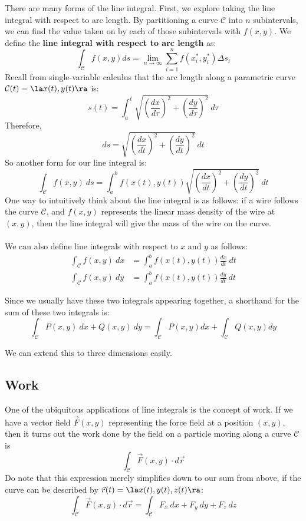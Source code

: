 \documentclass[12pt]{article}
\begin{document}
There are many forms of the line integral. First, we explore taking the line integral with respect to arc length. By partitioning a curve $\mathcal{C}$ into $n$ subintervals, we can find the value taken on by each of those subintervals with $f(x,y)$. We define the \textbf{line integral with respect to arc length} as: \[ \int_{\mathcal{C}}f(x,y) ds = \lim_{n \to \infty}\sum_{i=1}^nf(x_i^*,y_i^*)\Delta s_i \]
Recall from single-variable calculus that the arc length along a parametric curve $\mathcal{C}(t) = \la x(t), y(t) \ra$ is: \[ s(t) = \int_a^t\sqrt{\left(\frac{dx}{d\tau}\right)^2 + \left(\frac{dy}{d\tau}\right)^2} \ d\tau \]
Therefore, \[ ds = \sqrt{\left(\frac{dx}{dt}\right)^2 + \left(\frac{dy}{dt}\right)^2} \ dt \]
So another form for our line integral is:
\[ \boxed{\int_{\mathcal{C}}f(x,y) \ ds = \int_a^b f(x(t),y(t)) \sqrt{\left(\frac{dx}{dt}\right)^2 + \left(\frac{dy}{dt}\right)^2} \ dt} \]
One way to intuitively think about the line integral is as follows: if a wire follows the curve $\mathcal{C}$, and $f(x,y)$ represents the linear mass density of the wire at $(x,y)$, then the line integral will give the mass of the wire on the curve. \\ \\
We can also define line integrals with respect to $x$ and $y$ as follows:
\[
\begin{aligned}
\int_{\mathcal{C}}f(x,y) \ dx &= \int_a^b f(x(t),y(t))\frac{dx}{dt} \ dt \\
\int_{\mathcal{C}}f(x,y) \ dy &= \int_a^b f(x(t),y(t))\frac{dy}{dt} \ dt
\end{aligned}
\]

Since we usually have these two integrals appearing together, a shorthand for the sum of these two integrals is:
\[ \int_{\mathcal{C}}P(x,y) \ dx + Q(x,y) \ dy = \int_{\mathcal{C}}P(x,y) dx + \int_{\mathcal{C}} Q(x,y) dy \]

We can extend this to three dimensions easily.

\subsection{Work}
One of the ubiquitous applications of line integrals is the concept of work. If we have a vector field $\vec{F}(x,y)$ representing the force field at a position $(x,y)$, then it turns out the work done by the field on a particle moving along a curve $\mathcal{C}$ is \[ \int_{\mathcal{C}}\vec{F}(x,y) \cdot d\vec{r} \]
Do note that this expression merely simplifies down to our sum from above, if the curve can be described by $\vec{r}(t) = \la x(t),y(t),z(t) \ra$: \[ \int_{\mathcal{C}}\vec{F}(x,y) \cdot d\vec{r} = \int_{\mathcal{C}}F_x \ dx + F_y \ dy + F_z \ dz \]
\end{document}

